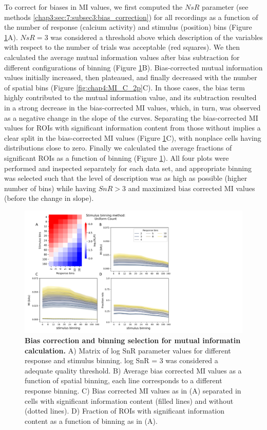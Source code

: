 To correct for biases in MI values, we first computed the $NsR$ parameter (see methods \ref{chap3:sec:7:subsec3:bias_correction}) for all recordings as a function of the number of response (calcium activity) and stimulus (position) bins (Figure \ref{fig:chap4:bias_corr_2p}A).
$NsR=3$ was considered a threshold above which description of the variables with respect to the number of trials was acceptable (red squares).
We then calculated the average mutual information values after bias subtraction for different configurations of binning (Figure \ref{fig:chap4:bias_corr_2p}B).
Bias-corrected mutual information values initially increased, then plateaued, and finally decreased with the number of spatial bins (Figure \ref{fig:chap4:MI_C_2p}C). 
In those cases, the bias term highly contributed to the mutual information value, and its subtraction resulted in a strong decrease in the bias-corrected MI values, which, in turn, was observed as a negative change in the slope of the curves. 
Separating the bias-corrected MI values for ROIs with significant information content from those without implies a clear split in the bias-corrected MI values (Figure \ref{fig:chap4:bias_corr_2p}C), with nonplace cells having distributions close to zero. 
Finally we calculated the average fractions of significant ROIs as a function of binning (Figure \ref{fig:chap4:bias_corr_2p}).
All four plots were performed and inspected separately for each data set, and appropriate binning was selected such that the level of description was as high as possible (higher number of bins) while having $SnR>3$ and maximized bias corrected MI values (before the change in slope).  
\begin{figure}[h]
    \centering
    \includegraphics[trim={0 0 300 0},clip,width=\textwidth]{Figures/Chapter4/bias_correction_2p.pdf}
    \caption[Bias correction and binning selection for mutual informatin calculation]{\textbf{Bias correction and binning selection for mutual informatin calculation.} A) Matrix of log SnR parameter values for different response and stimulus binning. 
    log SnR = 3 was considered a adequate quality threshold. 
    B) Average bias corrected MI values as a function of spatial binning, each line corresponds to a different response binning. 
    C) Bias corrected MI values as in (A) separated in cells with significant information content (filled lines) and without (dotted lines). 
    D) Fraction of ROIs with significant information content as a function of binning as in (A).}
    \label{fig:chap4:bias_corr_2p}
\end{figure}

